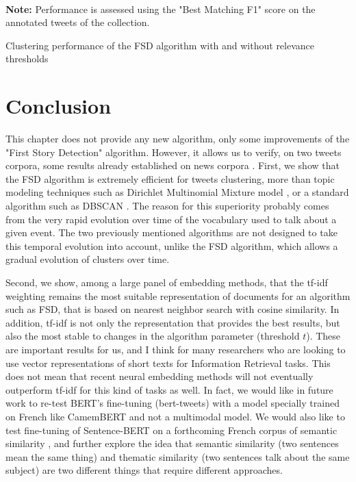 \begin{table}[ht]
\begin{center}

\\

{\scriptsize \textbf{Note:} Performance is assessed using the "Best Matching F1" score on the annotated tweets of the collection.}
\caption{Clustering performance of the FSD algorithm with and without relevance thresholds} \label{Tab: FSD_thresholds}
\end{center}
\end{table}


\section{Conclusion}

This chapter does not provide any new algorithm, only some improvements of the "First Story Detection" algorithm. However, it allows us to verify, on two tweets corpora, some results already established on news corpora \cite{cage2020production}. First, we show that the FSD algorithm is extremely efficient for tweets clustering, more than topic modeling techniques such as Dirichlet Multinomial Mixture model \cite{yin_dirichlet_2014}, or a standard algorithm such as DBSCAN \cite{ester1996density}.  The reason for this superiority probably comes from the very rapid evolution over time of the vocabulary used to talk about a given event. The two previously mentioned algorithms are not designed to take this temporal evolution into account, unlike the FSD algorithm, which allows a gradual evolution of clusters over time.

Second, we show, among a large panel of embedding methods, that the tf-idf weighting remains the most suitable representation of documents for an algorithm such as FSD, that is based on nearest neighbor search with cosine similarity. In addition, tf-idf is not only the representation that provides the best results, but also the most stable to changes in the algorithm parameter (threshold $t$). These are important results for us, and I think for many researchers who are looking to use vector representations of short texts for Information Retrieval tasks. This does not mean that recent neural embedding methods will not eventually outperform tf-idf for this kind of tasks as well. In fact, we would like in future work to re-test BERT's fine-tuning (bert-tweets) with a model specially trained on French like CamemBERT \cite{martin2020camembert} and not a multimodal model. We would also like to test fine-tuning of Sentence-BERT on a forthcoming French corpus of semantic similarity \cite{cardon2020french}, and further explore the idea that semantic similarity (two sentences mean the same thing) and thematic similarity (two sentences talk about the same subject) are two different things that require different approaches.


